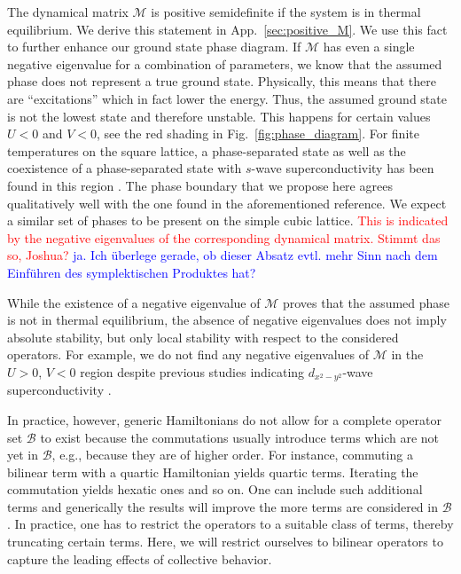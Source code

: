 \documentclass[
    reprint, 
    aps,
    preprintnumbers,
    twocolumn,
    prb,
    superscriptaddress
]{revtex4-2}
\newcommand{\mM}{\mathcal{M}}
\newcommand{\red}[1]{\textcolor{red}{#1}}
\newcommand{\blue}[1]{\textcolor{blue}{#1}}
\begin{document}
The dynamical matrix $\mM$ is positive semidefinite if the system is in thermal equilibrium.
We derive this statement in  App.\ \ref{sec:positive_M}.
We use this fact to further enhance our ground state phase diagram.
If $\mM$ has even a single negative eigenvalue for a combination of parameters, 
we know that the assumed phase does not represent a true ground state.
Physically, this means that there are ``excitations'' which in fact lower the energy. 
Thus, the assumed ground state is not the lowest state and therefore unstable.
This happens for certain values $U<0$ and $V<0$, see the red shading in Fig.\ \ref{fig:phase_diagram}.
For finite temperatures on the square lattice, a phase-separated state as well as the coexistence of a phase-separated state with $s$-wave superconductivity has been found in this region \cite{Linner23}.
The phase boundary that we propose here agrees qualitatively well with the one found in the aforementioned reference.
We expect a similar set of phases to be present on the simple cubic lattice. \red{This is indicated by
the negative eigenvalues of the corresponding dynamical matrix. Stimmt das so, Joshua?} \blue{ja. Ich überlege gerade, ob dieser Absatz evtl. mehr Sinn nach dem Einführen des symplektischen Produktes hat?}

While the existence of a negative eigenvalue of $\mM$ proves that the assumed phase is
not in thermal equilibrium, the absence of negative eigenvalues does not imply absolute stability,
but only local stability with respect to the considered operators.
For example, we do not find any negative eigenvalues of $\mM$ in the $U>0$, $V<0$ region despite previous studies indicating $d_{x^2 - y^2}$-wave superconductivity \cite{Micnas88b,Huang13}.

In practice, however, generic Hamiltonians do not allow for
a complete operator set $\mathcal{B}$ to exist because the commutations usually introduce terms which are not 
yet in $\mathcal{B}$, e.g., because they are of higher order.
For instance, commuting a bilinear term with a quartic Hamiltonian yields quartic terms. 
Iterating the commutation yields hexatic ones and so on.
One can include such additional terms and generically the results will improve the more
terms are considered in $\mathcal{B}$. In practice, one has to restrict the operators
to a suitable class of terms, thereby truncating certain terms. Here, we will restrict ourselves
to bilinear operators to capture the leading effects of collective behavior.
\end{document}
